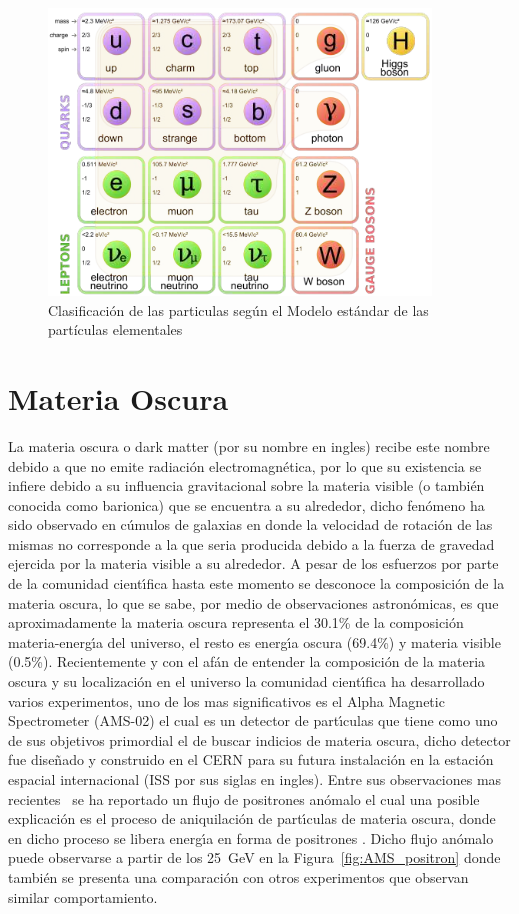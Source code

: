 \begin{figure}
\begin{center}
  \includegraphics[width=4.0in]{standard-model.png}
  \caption{Clasificaci\'on de las particulas seg\'un el Modelo est\'andar de las part\'iculas elementales}
  \label{fig:ME}
\end{center}
\end{figure}


\section{Materia Oscura}

La materia oscura o dark matter (por su nombre en ingles) recibe este nombre debido a que no emite radiaci\'on electromagn\'etica, por lo que su existencia se infiere debido a su influencia gravitacional sobre la materia visible (o tambi\'en conocida como barionica) que se encuentra a su alrededor, dicho fen\'omeno ha sido observado en c\'umulos de galaxias en donde la velocidad de rotaci\'on de las mismas no corresponde a la que seria producida debido a la fuerza de gravedad ejercida por la materia visible a su alrededor. A pesar de los esfuerzos por parte de la comunidad cient\'{\i}fica hasta este momento se desconoce la composici\'on de la materia oscura, lo que se sabe, por medio de observaciones astron\'omicas, es que aproximadamente la materia oscura representa el 30.1\%  de la composici\'on materia-energ\'{\i}a del universo, el resto es energ\'{\i}a oscura (69.4\%) y materia visible (0.5\%). Recientemente y con el af\'an de entender la composici\'on de la materia oscura y su localizaci\'on en el universo la comunidad cient\'{\i}fica ha desarrollado varios experimentos, uno de los mas significativos es el Alpha Magnetic Spectrometer (AMS-02) el cual es un detector de part\'{\i}culas que tiene como uno de sus objetivos primordial el de buscar indicios de materia oscura, dicho detector fue dise\~nado y construido en el CERN para su futura instalaci\'on en la estaci\'on espacial internacional (ISS por sus siglas en ingles). Entre sus observaciones mas recientes~\cite{ams:cern} se ha reportado un flujo de positrones an\'omalo el cual una posible explicaci\'on es el proceso de aniquilaci\'on de part\'{\i}culas de materia oscura, donde en dicho proceso se libera energ\'{\i}a en forma de positrones .  Dicho flujo an\'omalo puede observarse a partir de los 25~GeV en la Figura~\ref{fig:AMS_positron} donde tambi\'en se presenta una comparaci\'on con otros experimentos que observan similar comportamiento.

